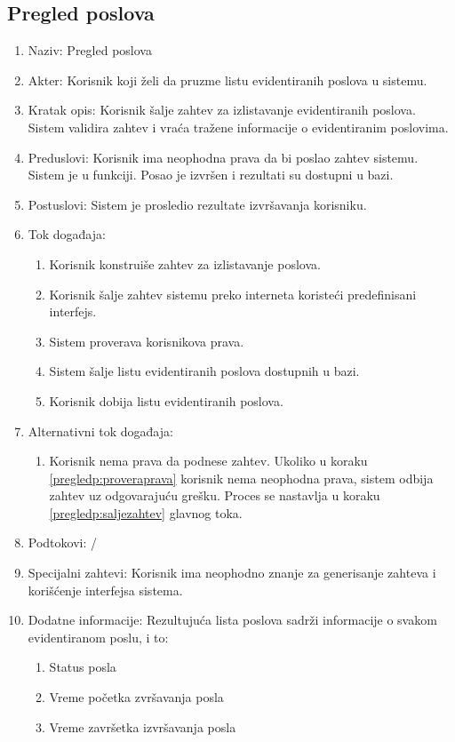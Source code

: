 \documentclass[12pt,oneside]{memoir}
\begin{document}
\subsection{Pregled poslova}
\begin{enumerate}
\item Naziv: Pregled poslova
\item Akter: Korisnik koji želi da pruzme listu evidentiranih poslova u sistemu.
\item Kratak opis: Korisnik šalje zahtev za izlistavanje evidentiranih poslova. Sistem validira zahtev i vraća tražene informacije o evidentiranim poslovima.
\item Preduslovi: Korisnik ima neophodna prava da bi poslao zahtev sistemu. Sistem je u funkciji. Posao je izvršen i rezultati su dostupni u bazi.
\item Postuslovi: Sistem je prosledio rezultate izvršavanja korisniku.
\item Tok događaja:
	\begin{enumerate}
	\item \label{pregledp:konstruisezahtev} Korisnik konstruiše zahtev za izlistavanje poslova.
	\item \label{pregledp:saljezahtev} Korisnik šalje zahtev sistemu preko interneta koristeći predefinisani interfejs.
	\item \label{pregledp:proveraprava} Sistem proverava korisnikova prava.
	\item \label{pregledp:slanjeliste} Sistem šalje listu evidentiranih poslova dostupnih u bazi.
	\item Korisnik dobija listu evidentiranih poslova.
	\end{enumerate}
\item Alternativni tok događaja:
	\begin{enumerate}
	\item Korisnik nema prava da podnese zahtev. Ukoliko u koraku \ref{pregledp:proveraprava} korisnik nema neophodna prava, sistem odbija zahtev uz odgovarajuću grešku. Proces se nastavlja u koraku \ref{pregledp:saljezahtev} glavnog toka.
	\end{enumerate}
\item Podtokovi: /
\item Specijalni zahtevi: Korisnik ima neophodno znanje za generisanje zahteva i korišćenje interfejsa sistema.
\item Dodatne informacije: Rezultujuća lista poslova sadrži informacije o svakom evidentiranom poslu, i to:
	\begin{enumerate}
	\item Status posla
	\item Vreme početka zvršavanja posla
	\item Vreme završetka izvršavanja posla
	\end{enumerate}
\end{enumerate}
\end{document}
